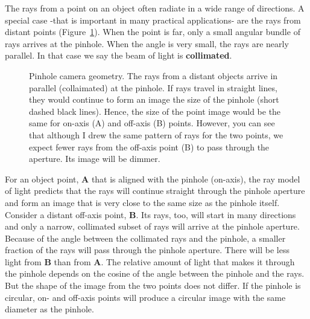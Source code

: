 \documentclass[
  letterpaper,
]{book}
\begin{document}
The rays from a point on an object often radiate in a wide range of
directions. A special case -that is important in many practical
applications- are the rays from distant points
(Figure~\ref{fig-pinhole-distant}). When the point is far, only a small
angular bundle of rays arrives at the pinhole. When the angle is very
small, the rays are nearly parallel. In that case we say the beam of
light is \textbf{collimated}.

\begin{figure}


\caption{\label{fig-pinhole-distant}Pinhole camera geometry. The rays
from a distant objects arrive in parallel (collaimated) at the pinhole.
If rays travel in straight lines, they would continue to form an image
the size of the pinhole (short dashed black lines). Hence, the size of
the point image would be the same for on-axis (A) and off-axis (B)
points. However, you can see that although I drew the same pattern of
rays for the two points, we expect fewer rays from the off-axis point
(B) to pass through the aperture. Its image will be dimmer.}

\end{figure}%

For an object point, \textbf{A} that is aligned with the pinhole
(on-axis), the ray model of light predicts that the rays will continue
straight through the pinhole aperture and form an image that is very
close to the same size as the pinhole itself. Consider a distant
off-axis point, \textbf{B}. Its rays, too, will start in many directions
and only a narrow, collimated subset of rays will arrive at the pinhole
aperture. Because of the angle between the collimated rays and the
pinhole, a smaller fraction of the rays will pass through the pinhole
aperture. There will be less light from \textbf{B} than from \textbf{A}.
The relative amount of light that makes it through the pinhole depends
on the cosine of the angle between the pinhole and the rays. But the
shape of the image from the two points does not differ. If the pinhole
is circular, on- and off-axis points will produce a circular image with
the same diameter as the pinhole.
\end{document}
